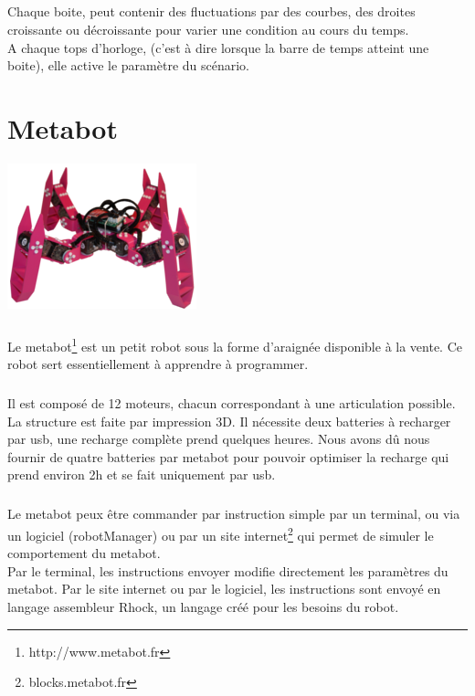 \documentclass[10pt,a4paper]{report}
\begin{document}
\paragraph{}
Chaque boite, peut contenir des fluctuations par des courbes, des droites croissante ou décroissante pour varier une condition au cours du temps.
\\
A chaque tops d'horloge, (c'est à dire lorsque la barre de temps atteint une boite), elle active le paramètre du scénario.


\chapter{Metabot}
\begin{center}
\includegraphics[scale=0.5]{image/metabot.jpg}
\end{center}

\paragraph{}
Le metabot\footnote{http://www.metabot.fr} est un petit robot sous la forme d'araignée disponible à la vente. Ce robot sert essentiellement à apprendre à programmer.
\paragraph{}
Il est composé de 12 moteurs, chacun correspondant à une articulation possible. La structure est faite par impression 3D. 
Il nécessite deux batteries à recharger par usb, une recharge complète prend quelques heures. Nous avons dû nous fournir de quatre batteries par metabot pour pouvoir optimiser la recharge qui prend environ 2h et se fait uniquement par usb.
\paragraph{}
Le metabot peux être commander par instruction simple par un terminal, ou via un logiciel (robotManager) ou par un site internet\footnote{blocks.metabot.fr} qui permet de simuler le comportement du metabot.
\\
Par le terminal, les instructions envoyer modifie directement les paramètres du metabot. Par le site internet ou par le logiciel, les instructions sont envoyé en langage assembleur Rhock, un langage créé pour les besoins du robot.
\end{document}
